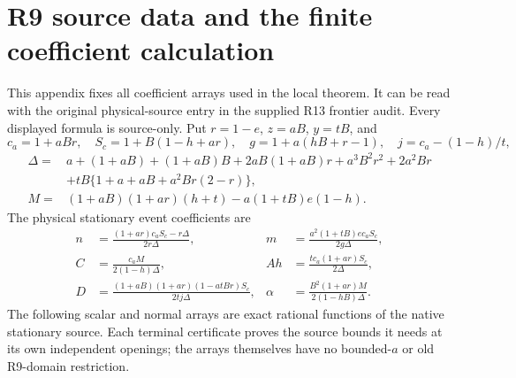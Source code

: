 \section{\texorpdfstring{R9 source data and the finite coefficient calculation}{R9 source data and the finite coefficient calculation}}
\label{component:pd709027c7805}

This appendix fixes all coefficient arrays used in the local theorem.
It can be read with the original physical-source entry in the supplied
R13 frontier audit. Every displayed formula is source-only.
Put $r=1-e$, $z=aB$, $y=tB$, and
\[
 c_a=1+aBr,\quad S_c=1+B(1-h+ar),\quad
 g=1+a(hB+r-1),\quad j=c_a-(1-h)/t,
\]
\begin{align*}
\Delta={}&a+(1+aB)+(1+aB)B+2aB(1+aB)r+a^3B^2r^2+2a^2Br\\
 &+tB\{1+a+aB+a^2Br(2-r)\},\\
M={}&(1+aB)(1+ar)(h+t)-a(1+tB)e(1-h).
\end{align*}
The physical stationary event coefficients are
\[
\begin{aligned}
n&=\frac{(1+ar)c_aS_c-r\Delta}{2r\Delta},&
m&=\frac{a^2(1+tB)e c_aS_c}{2g\Delta},\\
C&=\frac{c_aM}{2(1-h)\Delta},&
Ah&=\frac{t c_a(1+ar)S_c}{2\Delta},\\
D&=\frac{(1+aB)(1+ar)(1-atBr)S_c}{2tj\Delta},&
\alpha&=\frac{B^2(1+ar)M}{2(1-hB)\Delta}.
\end{aligned}
\]
The following scalar and normal arrays are exact rational functions of
the native stationary source. Each terminal certificate proves the source
bounds it needs at its own independent openings; the arrays themselves
have no bounded-$a$ or old R9-domain restriction.

